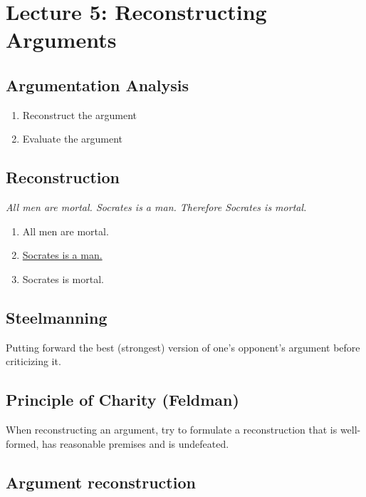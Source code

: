 
\section{Lecture 5: Reconstructing Arguments}

\subsection{Argumentation Analysis}

\begin{enumerate}
    \item Reconstruct the argument
    \item Evaluate the argument
\end{enumerate}

\subsection{Reconstruction}

\textit{All men are mortal. Socrates is a man. Therefore
Socrates is mortal.}

\begin{enumerate}
    \item All men are mortal.
    \item \underline{Socrates is a man.}
    \item Socrates is mortal.
\end{enumerate}

\subsection{Steelmanning}

Putting forward the best (strongest) version of one's
opponent's argument before criticizing it.

\subsection{Principle of Charity (Feldman)}

When reconstructing an argument, try to formulate a reconstruction that is
well-formed, has reasonable premises and is undefeated.

\subsection{Argument reconstruction}

